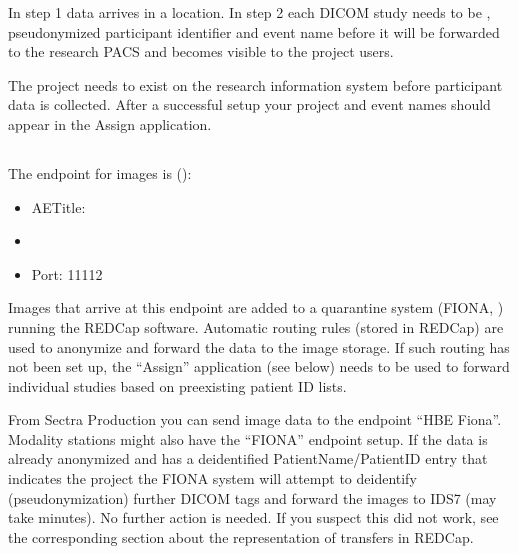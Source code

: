 \documentclass[letterpaper,10pt,english]{sphinxmanual}
\begin{document}
\sphinxAtStartPar
In step 1 data arrives in a  location. In step 2 each DICOM study needs to be , pseudonymized participant identifier and event name before it will be forwarded to the research PACS and becomes visible to the project users.

\begin{figure}[htbp]
\centering

\noindent{}
\end{figure}



\sphinxAtStartPar
{}

\sphinxAtStartPar
The project needs to exist on the research information system before participant data is collected. After a successful setup your project and event names should appear in the Assign application.


\subsection{}
\label{\detokenize{EndUser/index:how-to-add-image-data}}
\sphinxAtStartPar
The end\sphinxhyphen{}point for images is  ():
\begin{itemize}
\item {} 
\sphinxAtStartPar
AETitle: 

\item {} 
\sphinxAtStartPar
{}

\item {} 
\sphinxAtStartPar
Port: 11112

\end{itemize}

\sphinxAtStartPar
Images that arrive at this endpoint are added to a quarantine system (FIONA, ) running the REDCap software. Automatic routing rules (stored in REDCap) are used to anonymize and forward the data to the image storage. If such routing has not been set up, the “Assign” application (see below) needs to be used to forward individual studies based on pre\sphinxhyphen{}existing patient ID lists.

\sphinxAtStartPar
From Sectra Production you can send image data to the endpoint “HBE Fiona”. Modality stations might also have the “FIONA” endpoint setup. If the data is already anonymized and has a de\sphinxhyphen{}identified PatientName/PatientID entry that indicates the project the FIONA system will attempt to de\sphinxhyphen{}identify (pseudonymization) further DICOM tags and forward the images to IDS7 (may take minutes). No further action is needed. If you suspect this did not work, see the corresponding section about the representation of transfers in REDCap.
\end{document}
